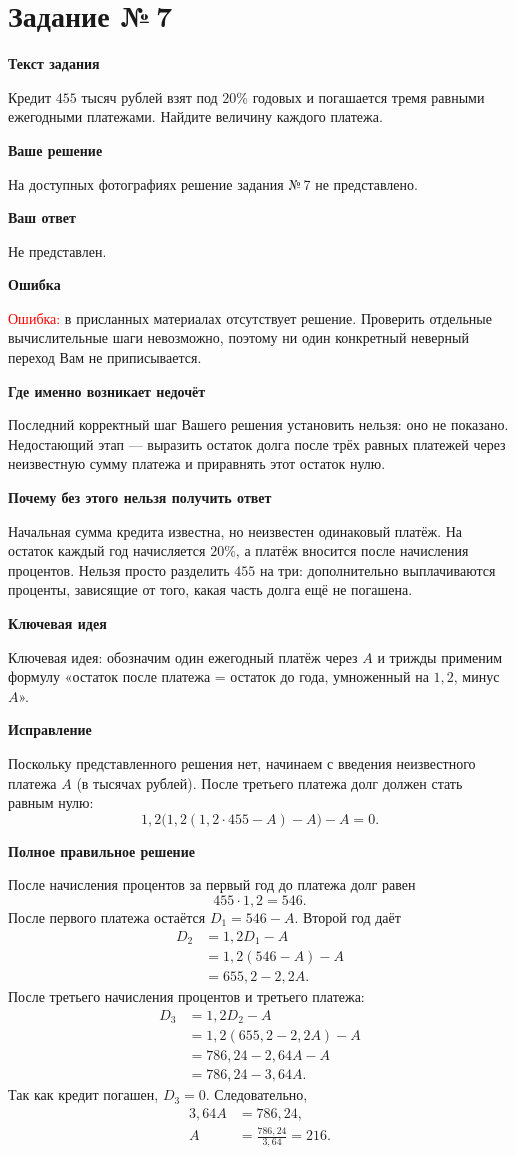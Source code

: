 \documentclass[12pt,a4paper]{article}
\newcommand{\subpart}[1]{\par\medskip\noindent\textbf{#1}\par\nobreak\smallskip}
\begin{document}
\clearpage
{}\label{task:7}
\section*{Задание №\,7}
\subpart{Текст задания}
Кредит $455$ тысяч рублей взят под $20\%$ годовых и погашается
тремя равными ежегодными платежами. Найдите величину каждого платежа.

\subpart{Ваше решение}
На доступных фотографиях решение задания №\,7 не представлено.

\subpart{Ваш ответ}
Не представлен.

\subpart{Ошибка}
\textcolor{red}{Ошибка:} в присланных материалах отсутствует решение.
Проверить отдельные вычислительные шаги невозможно, поэтому
ни один конкретный неверный переход Вам не приписывается.

\subpart{Где именно возникает недочёт}
Последний корректный шаг Вашего решения установить нельзя:
оно не показано. Недостающий этап --- выразить остаток долга после
трёх равных платежей через неизвестную сумму платежа и приравнять
этот остаток нулю.

\subpart{Почему без этого нельзя получить ответ}
Начальная сумма кредита известна, но неизвестен одинаковый платёж.
На остаток каждый год начисляется $20\%$, а платёж вносится
после начисления процентов. Нельзя просто разделить $455$ на три:
дополнительно выплачиваются проценты, зависящие от того,
какая часть долга ещё не погашена.

\subpart{Ключевая идея}
\textcolor{blue!60!black}{Ключевая идея:} обозначим один ежегодный
платёж через $A$ и трижды применим формулу
«остаток после платежа = остаток до года, умноженный на $1{,}2$,
минус $A$».

\subpart{Исправление}
Поскольку представленного решения нет, начинаем с введения
неизвестного платежа $A$ (в тысячах рублей). После третьего платежа
долг должен стать равным нулю:
\[
1{,}2\bigl(1{,}2(1{,}2\cdot455-A)-A\bigr)-A=0.
\]

\subpart{Полное правильное решение}
После начисления процентов за первый год до платежа долг равен
\[
455\cdot1{,}2=546.
\]
После первого платежа остаётся $D_1=546-A$.
Второй год даёт
\begin{align*}
D_2&=1{,}2D_1-A\\
   &=1{,}2(546-A)-A\\
   &=655{,}2-2{,}2A.
\end{align*}
После третьего начисления процентов и третьего платежа:
\begin{align*}
D_3&=1{,}2D_2-A\\
   &=1{,}2(655{,}2-2{,}2A)-A\\
   &=786{,}24-2{,}64A-A\\
   &=786{,}24-3{,}64A.
\end{align*}
Так как кредит погашен, $D_3=0$. Следовательно,
\begin{align*}
3{,}64A&=786{,}24,\\
A&=\frac{786{,}24}{3{,}64}=216.
\end{align*}
\end{document}
